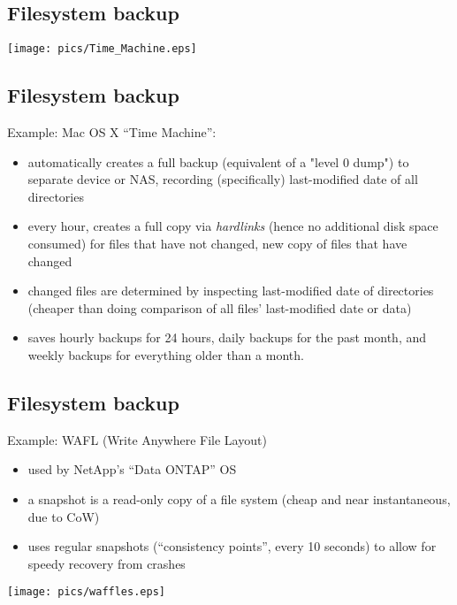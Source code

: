 \documentclass[xga]{xdvislides}
\begin{document}
\subsection{Filesystem backup}
\vspace*{\fill}
\begin{center}
	\texttt{[image: pics/Time\_Machine.eps]}
\end{center}
\vspace*{\fill}


\subsection{Filesystem backup}
Example: Mac OS X ``Time Machine'':
\begin{itemize}
	\item automatically creates a full backup (equivalent of a "level 0 dump")
		to separate device or NAS, recording (specifically) last-modified date
		of all directories
	\item every hour, creates a full copy via {\em hardlinks} (hence no
		additional disk space consumed) for files that have not changed,
		new copy of files that have changed
		\item changed files are determined by inspecting last-modified date of
			directories (cheaper than doing comparison of all files'
			last-modified date or data)
	\item saves hourly backups for 24 hours, daily backups for
		the past month, and weekly backups for everything older than a month.
\end{itemize}

\subsection{Filesystem backup}
Example: WAFL (Write Anywhere File Layout)
\begin{itemize}
	\item used by NetApp's ``Data ONTAP'' OS
	\item a snapshot is a read-only copy of a file system (cheap and near
		instantaneous, due to CoW)
	\item uses regular snapshots (``consistency points'', every 10 seconds)
		to allow for speedy recovery from crashes
\end{itemize}
\vspace*{\fill}
\begin{center}
	\texttt{[image: pics/waffles.eps]}
\end{center}
\vspace*{\fill}
\end{document}

